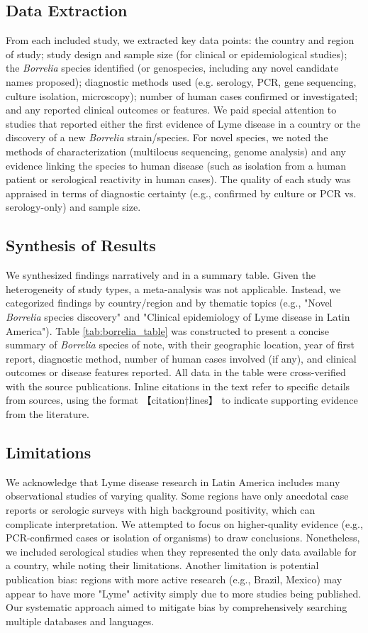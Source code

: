 \documentclass[11pt,letterpaper]{article}
\begin{document}
\subsection{Data Extraction}
From each included study, we extracted key data points: the country and region of study; study design and sample size (for clinical or epidemiological studies); the \textit{Borrelia} species identified (or genospecies, including any novel candidate names proposed); diagnostic methods used (e.g. serology, PCR, gene sequencing, culture isolation, microscopy); number of human cases confirmed or investigated; and any reported clinical outcomes or features. We paid special attention to studies that reported either the first evidence of Lyme disease in a country or the discovery of a new \textit{Borrelia} strain/species. For novel species, we noted the methods of characterization (multilocus sequencing, genome analysis) and any evidence linking the species to human disease (such as isolation from a human patient or serological reactivity in human cases). The quality of each study was appraised in terms of diagnostic certainty (e.g., confirmed by culture or PCR vs. serology-only) and sample size.

\subsection{Synthesis of Results}
We synthesized findings narratively and in a summary table. Given the heterogeneity of study types, a meta-analysis was not applicable. Instead, we categorized findings by country/region and by thematic topics (e.g., "Novel \textit{Borrelia} species discovery" and "Clinical epidemiology of Lyme disease in Latin America"). Table \ref{tab:borrelia_table} was constructed to present a concise summary of \textit{Borrelia} species of note, with their geographic location, year of first report, diagnostic method, number of human cases involved (if any), and clinical outcomes or disease features reported. All data in the table were cross-verified with the source publications. Inline citations in the text refer to specific details from sources, using the format 【citation†lines】 to indicate supporting evidence from the literature.

\subsection{Limitations}
We acknowledge that Lyme disease research in Latin America includes many observational studies of varying quality. Some regions have only anecdotal case reports or serologic surveys with high background positivity, which can complicate interpretation. We attempted to focus on higher-quality evidence (e.g., PCR-confirmed cases or isolation of organisms) to draw conclusions. Nonetheless, we included serological studies when they represented the only data available for a country, while noting their limitations. Another limitation is potential publication bias: regions with more active research (e.g., Brazil, Mexico) may appear to have more "Lyme" activity simply due to more studies being published. Our systematic approach aimed to mitigate bias by comprehensively searching multiple databases and languages.
\end{document}
